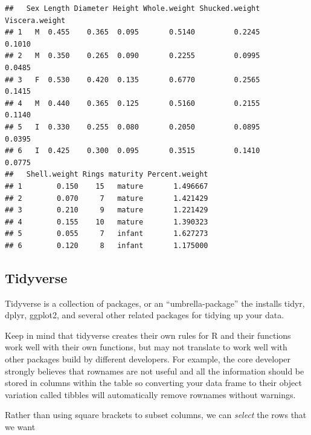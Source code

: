 \documentclass[
]{book}
\newenvironment{Shaded}{\begin{snugshade}}{\end{snugshade}}
\newcommand{\CommentTok}[1]{\textcolor[rgb]{0.56,0.35,0.01}{\textit{#1}}}
\newcommand{\FunctionTok}[1]{\textcolor[rgb]{0.13,0.29,0.53}{\textbf{#1}}}
\newcommand{\NormalTok}[1]{#1}
\newcommand{\SpecialCharTok}[1]{\textcolor[rgb]{0.81,0.36,0.00}{\textbf{#1}}}
\begin{document}
\begin{verbatim}
##   Sex Length Diameter Height Whole.weight Shucked.weight Viscera.weight
## 1   M  0.455    0.365  0.095       0.5140         0.2245         0.1010
## 2   M  0.350    0.265  0.090       0.2255         0.0995         0.0485
## 3   F  0.530    0.420  0.135       0.6770         0.2565         0.1415
## 4   M  0.440    0.365  0.125       0.5160         0.2155         0.1140
## 5   I  0.330    0.255  0.080       0.2050         0.0895         0.0395
## 6   I  0.425    0.300  0.095       0.3515         0.1410         0.0775
##   Shell.weight Rings maturity Percent.weight
## 1        0.150    15   mature       1.496667
## 2        0.070     7   mature       1.421429
## 3        0.210     9   mature       1.221429
## 4        0.155    10   mature       1.390323
## 5        0.055     7   infant       1.627273
## 6        0.120     8   infant       1.175000
\end{verbatim}

\subsection{Tidyverse}\label{tidyverse}

Tidyverse is a collection of packages, or an ``umbrella-package'' the installs tidyr, dplyr, ggplot2, and several other related packages for tidying up your data.

Keep in mind that tidyverse creates their own rules for R and their functions work well with their own functions, but may not translate to work well with other packages build by different developers. For example, the core developer strongly believes that rownames are not useful and all the information should be stored in columns within the table so converting your data frame to their object variation called tibbles will automatically remove rownames without warnings.

Rather than using square brackets to subset columns, we can \emph{select} the rows that we want

\begin{Shaded}
\end{Shaded}
\end{document}
